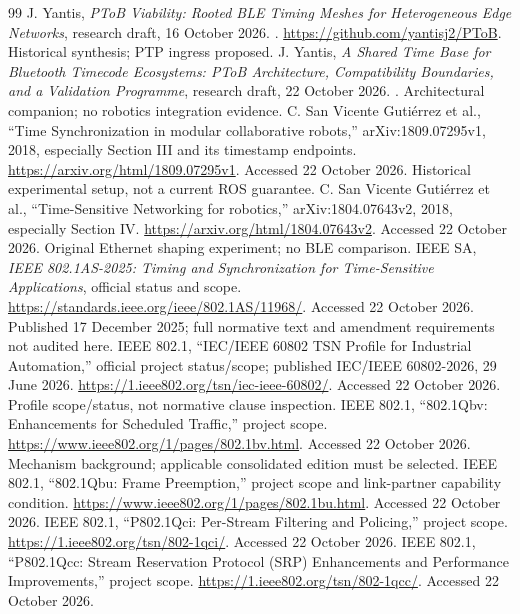 \documentclass[11pt,letterpaper]{article}
\begin{document}
\begin{thebibliography}{99}\small
{} J. Yantis, \emph{PToB Viability: Rooted BLE Timing Meshes for Heterogeneous Edge Networks}, research draft, 16 October 2026. . \url{https://github.com/yantisj2/PToB}. Historical synthesis; PTP ingress proposed.
 J. Yantis, \emph{A Shared Time Base for Bluetooth Timecode Ecosystems: PToB Architecture, Compatibility Boundaries, and a Validation Programme}, research draft, 22 October 2026. . Architectural companion; no robotics integration evidence.
 C. San Vicente Guti\'errez et al., ``Time Synchronization in modular collaborative robots,'' arXiv:1809.07295v1, 2018, especially Section III and its timestamp endpoints. \url{https://arxiv.org/html/1809.07295v1}. Accessed 22 October 2026. Historical experimental setup, not a current ROS guarantee.
 C. San Vicente Guti\'errez et al., ``Time-Sensitive Networking for robotics,'' arXiv:1804.07643v2, 2018, especially Section IV. \url{https://arxiv.org/html/1804.07643v2}. Accessed 22 October 2026. Original Ethernet shaping experiment; no BLE comparison.
 IEEE SA, \emph{IEEE 802.1AS-2025: Timing and Synchronization for Time-Sensitive Applications}, official status and scope. \url{https://standards.ieee.org/ieee/802.1AS/11968/}. Accessed 22 October 2026. Published 17 December 2025; full normative text and amendment requirements not audited here.
 IEEE 802.1, ``IEC/IEEE 60802 TSN Profile for Industrial Automation,'' official project status/scope; published IEC/IEEE 60802-2026, 29 June 2026. \url{https://1.ieee802.org/tsn/iec-ieee-60802/}. Accessed 22 October 2026. Profile scope/status, not normative clause inspection.
 IEEE 802.1, ``802.1Qbv: Enhancements for Scheduled Traffic,'' project scope. \url{https://www.ieee802.org/1/pages/802.1bv.html}. Accessed 22 October 2026. Mechanism background; applicable consolidated edition must be selected.
 IEEE 802.1, ``802.1Qbu: Frame Preemption,'' project scope and link-partner capability condition. \url{https://www.ieee802.org/1/pages/802.1bu.html}. Accessed 22 October 2026.
 IEEE 802.1, ``P802.1Qci: Per-Stream Filtering and Policing,'' project scope. \url{https://1.ieee802.org/tsn/802-1qci/}. Accessed 22 October 2026.
 IEEE 802.1, ``P802.1Qcc: Stream Reservation Protocol (SRP) Enhancements and Performance Improvements,'' project scope. \url{https://1.ieee802.org/tsn/802-1qcc/}. Accessed 22 October 2026.

\end{thebibliography}
\end{document}
